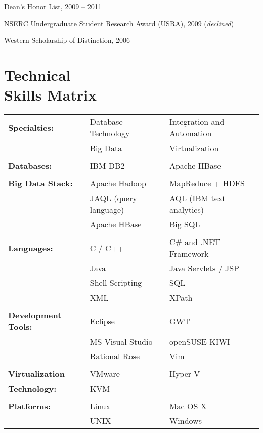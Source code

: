 \documentclass[margin,line]{resume}
\begin{document}
\begin{resume}
\begin{list2}
	\item Dean's Honor List, 2009 -- 2011
	\item \href{http://www.uwo.ca/research/funding/internal/nserc_usra.html}{NSERC Undergraduate Student Research Award (USRA)}, 2009	\hfill(\textsl{declined})
	\item Western Scholarship of Distinction, 2006 
\end{list2}


\newpage


\section{\mysidestyle Technical\\Skills Matrix} 

\begin{tabular}{@{}p{1.75in}p{1.75in}p{1.75in}}

\textbf{Specialties:}		&	Database Technology	&	Integration and Automation	\\
				&	Big Data		&	Virtualization			\\
\\
\textbf{Databases:}		&	IBM DB2			&	Apache HBase			\\
\\
\textbf{Big Data Stack:}	&	Apache Hadoop		&	MapReduce + HDFS		\\
				&	JAQL (query language)	&	AQL (IBM text analytics)	\\
                                &       Apache HBase		&       Big SQL				\\
\\
\textbf{Languages:}		&	C / C++			&	C\# and .NET Framework		\\
				&	Java			&	Java Servlets / JSP		\\
				&	Shell Scripting		&	SQL				\\
				&	XML			&	XPath				\\
\\
\textbf{Development Tools:}	&	Eclipse			&	GWT				\\
				&	MS Visual Studio	&	openSUSE KIWI			\\
				&	Rational Rose		&	Vim				\\
\\
\textbf{Virtualization }	&	VMware			&	Hyper-V				\\
\textbf{Technology:}		&	KVM			&					\\
\\
\textbf{Platforms:}		&	Linux			&	Mac OS X			\\
				&	UNIX			&	Windows				\\


\end{tabular}
\end{resume}
\end{document}

